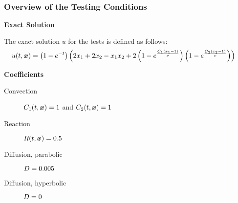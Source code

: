 \begin{frame}
    \frametitle{Overview of the Testing Conditions}

    \vspace*{\fill}
    \begin{center}
        {\color{\accentcolor} \Large \textbf{Exact Solution}}
        \vspace*{0.25cm}

        \begin{minipage}{0.75\textwidth}
            \begin{definition}
                The exact solution $u$ for the tests is defined as follows:
                \begin{align*}
                    u(t, \bm{x}) &= \left( 1 - e^{-t} \right) \left( 2 x_1 + 2 x_2 - x_1 x_2 + 2 \left( 1 - e^{\frac{C_1 \left( x_1 - 1 \right) }{\nu}} \right) \left( 1 - e^{\frac{C_2 \left( x_2 - 1 \right) }{\nu}} \right) \right)
                \end{align*}
            \end{definition}
        \end{minipage}
    \end{center}

    \vspace*{\fill}

    \begin{center}
        {\color{\accentcolor} \Large \textbf{Coefficients}}
        \vspace*{0.5cm}

        \begin{minipage}{0.5\textwidth}
            \begin{description}
                \item[Convection] $C_1(t, \bm{x}) = 1$ and $C_2(t, \bm{x}) = 1$
                \item[Reaction] $R(t, \bm{x}) = 0.5$ 
                \item[Diffusion, parabolic] $D = 0.005$
                \item[Diffusion, hyperbolic] $D = 0$
            \end{description}
        \end{minipage}
    \end{center}
    \vspace*{\fill}
    
\end{frame}

